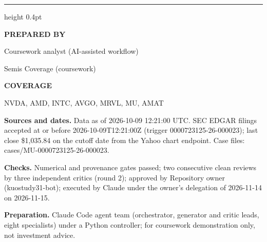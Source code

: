 \documentclass[a4paper,10pt]{article}
\newcommand{\DataDate}{2026-10-09 12:21:00 UTC}
\newcommand{\TeamName}{Semis Coverage (coursework)}
\newcommand{\ReportAuthor}{Coursework analyst (AI-assisted workflow)}
\newcommand{\Coverage}{NVDA, AMD, INTC, AVGO, MRVL, MU, AMAT}
\begin{document}
\par\vfill

{\color{MemoRule}\hrule height 0.4pt}\medskip
\begin{minipage}[t]{0.36\textwidth}
\vspace{0pt}\small
\setlength{\parskip}{3pt}
\textbf{PREPARED BY}\par\ReportAuthor\par\TeamName\par
\medskip\textbf{COVERAGE}\par\Coverage
\end{minipage}\hfill
\begin{minipage}[t]{0.60\textwidth}
\vspace{0pt}\footnotesize
\setlength{\parskip}{3pt}
\textbf{Sources and dates.} Data as of \DataDate.
SEC EDGAR filings accepted at or before 2026-10-09T12:21:00Z (trigger 0000723125-26-000023); last close \$1,035.84 on the cutoff date from the Yahoo chart endpoint. Case files: cases/MU-0000723125-26-000023.

\textbf{Checks.} Numerical and provenance gates passed; two consecutive clean reviews by three independent critics (round 2); approved by Repository owner (kuostudy31-bot); executed by Claude under the owner's delegation of 2026-11-14 on 2026-11-15.

\textbf{Preparation.} Claude Code agent team (orchestrator, generator and critic leads, eight specialists) under a Python controller; for coursework demonstration only, not investment advice.
\end{minipage}
\end{document}
